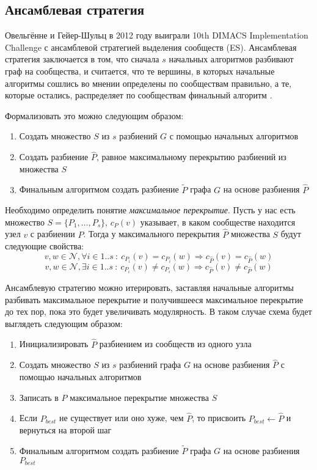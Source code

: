 
\subsection{Ансамблевая стратегия}
\label{subsec:ens}

Овельгённе и Гейер-Шульц в 2012 году выиграли 10th DIMACS Implementation Challenge с ансамблевой стратегией выделения сообществ (ES). Ансамблевая стратегия заключается в том, что сначала $s$ начальных алгоритмов разбивают граф на сообщества, и считается, что те вершины, в которых начальные алгоритмы сошлись во мнении определены по сообществам правильно, а те, которые остались, распределяет по сообществам финальный алгоритм \cite{Ovelgoenne&Geyer-Schulz:2012b}.

Формализовать это можно следующим образом:
\begin{enumerate}
	\item Создать множество $S$ из $s$ разбиений $G$ с помощью начальных алгоритмов
	\item Создать разбиение $\hat{P}$, равное максимальному перекрытию разбиений из множества $S$
	\item Финальным алгоритмом создать разбиение $\widetilde{P}$ графа $G$ на основе разбиения $\hat{P}$
\end{enumerate}

Необходимо определить понятие \emph{максимальное перекрытие}. Пусть у нас есть множество $S = \{P_1, \dots, P_s\}$, $c_P(v)$ указывает, в каком сообществе находится узел $v$ с разбиении $P$.
Тогда у максимального перекрытия $\hat{P}$ множества $S$ будут следующие свойства:
$$v, w \in \mathscr{N}, \forall i \in 1..s\ :\ c_{P_i}(v) = c_{P_i}(w) \Rightarrow c_{\hat{P}}(v) = c_{\hat{P}}(w)$$
$$v, w \in \mathscr{N}, \exists i \in 1..s\ :\ c_{P_i}(v) \ne c_{P_i}(w) \Rightarrow c_{\hat{P}}(v) \ne c_{\hat{P}}(w)$$

Ансамблевую стратегию можно итерировать, заставляя начальные алгоритмы разбивать максимальное перекрытие и получившееся максимальное перекрытие до тех пор, пока это будет увеличивать модулярность. В таком случае схема будет выглядеть следующим образом:

\begin{enumerate}
	\item Инициализировать $\hat{P}$ разбиением из сообществ из одного узла
	\item Создать множество $S$ из $s$ разбиений графа $G$ на основе разбиения $\hat{P}$ с помощью начальных алгоритмов
	\item Записать в $\hat{P}$ максимальное перекрытие множества $S$
	\item Если $P_{best}$ не существует или оно хуже, чем $\hat{P}$, то присвоить $P_{best} \leftarrow \hat{P}$ и вернуться на второй шаг
	\item Финальным алгоритмом создать разбиение $\widetilde{P}$ графа $G$ на основе разбиения $P_{best}$ 
\end{enumerate}

